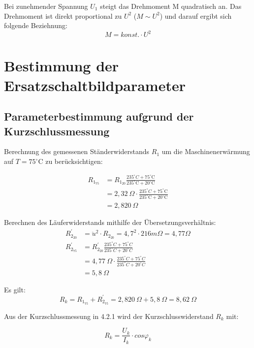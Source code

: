 \documentclass[conference]{IEEEtran}
\begin{document}
Bei zunehmender Spannung $U_1$ steigt das Drehmoment M quadratisch an. Das
Drehmoment ist direkt proportional zu $U^2$ ($M \sim U^2$) und darauf ergibt
sich folgende Beziehnung: \[ M = \textit{konst.} \cdot U^{2} \]


\section{Bestimmung der Ersatzschaltbildparameter}
\subsection{Parameterbestimmung aufgrund der Kurzschlussmessung}

Berechnung des gemessenen Ständerwiderstands $R_{1}$ um die Maschinenerwärmung
auf $T=75^\circ$C zu berücksichtigen:

\begin{align}
    R_{1_{75}} & = R_{1_{20}}\frac{235^\circ\si{C}+75^\circ\text{C}}{235^\circ\text{C}+20^\circ\text{C}}         \\
               & = 2,32\ \Omega\cdot \frac{235^\circ\si{C}+75^\circ\text{C}}{235^\circ\text{C}+20^\circ\text{C}} \\
    \label{eq:R1_75}
               & = 2,820\ \Omega
\end{align}

Berechnen des Läuferwiderstands mithilfe der Übersetzungsverhältnis:
\begin{align}
    R_{2_{20}}^\prime        & = \ddot{u}^2\cdot R_{2_{20}} = 4,7^2 \cdot 216\si{m\Omega}   = 4,77 \Omega                       \\
    R_{2_{75}}^\prime & = R_{2_{20}}^\prime \frac{235^\circ\si{C}+75^\circ\si{C}}{235^\circ\si{C}+20^\circ\si{C}}         \\
                      & = 4,77\ \Omega\cdot \frac{235^\circ\si{C}+75^\circ\si{C}}{235^\circ\si{C}+20^\circ\si{C}} \\
    \label{eq:R_2^prime}
                      & = 5,8\ \Omega
\end{align}

Es gilt:
\begin{equation} \label{eq:Kurzschlusswiderstand_gemessen}
    \boxed{R_k = R_{1_{75}} + R_{2_{75}}^\prime = 2,820\ \Omega + 5,8\ \Omega = 8,62\ \Omega}
\end{equation}

Aus der Kurzschlussmessung in 4.2.1 wird der Kurzschlusswiderstand $R_k$ mit:

\begin{equation} \label{eq:Kurzschlusswiderstand}
    \boxed{R_k = \frac{U_k}{I_k}\cdot cos\varphi_k}
\end{equation}
\end{document}
